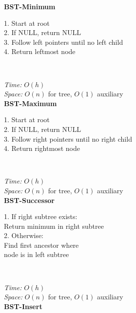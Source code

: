 \documentclass[a4paper]{extarticle}
\newcommand{\algofont}{\fontsize{4.3pt}{4.7pt}\selectfont}
\newcommand{\algocode}[1]{%
  \vspace{0pt}%
  \begin{algorithm}[H]
    \setlength{\abovecaptionskip}{0pt}%
    \setlength{\belowcaptionskip}{0pt}
    \setlength{\intextsep}{0pt}%
    \setlength{\textfloatsep}{0pt}
    \algofont  %
  \end{algorithm}%
  \vspace{0pt}%
}
\begin{document}
\begin{paracol}{3}
{\begin{minipage}[t]{1\linewidth}
\begin{minipage}[t]{0.49\linewidth}
       \textbf{BST-Minimum}\\
       \begin{minipage}[t]{\linewidth}
           1. Start at root\\
           2. If NULL, return NULL\\
           3. Follow left pointers until no left child\\
           4. Return leftmost node
       \end{minipage}\\[-10px]
       \algocode{bst-minimum}\vspace*{-25px}
       \textit{Time:} \(O(h)\)\\
       \textit{Space:} \(O(n)\) for tree, \(O(1)\) auxiliary\\
       \textbf{BST-Maximum}\\
       \begin{minipage}[t]{\linewidth}
           1. Start at root\\
           2. If NULL, return NULL\\
           3. Follow right pointers until no right child\\
           4. Return rightmost node
       \end{minipage}\\[-10px]
       \algocode{bst-maximum}\vspace*{-25px}
       \textit{Time:} \(O(h)\)\\
       \textit{Space:} \(O(n)\) for tree, \(O(1)\) auxiliary\\
       \textbf{BST-Successor}\\
       \begin{minipage}[t]{\linewidth}
           1. If right subtree exists:\\
           \quad Return minimum in right subtree\\
           2. Otherwise:\\
           \quad Find first ancestor where\\
           \quad node is in left subtree
       \end{minipage}\\[-10px]
       \algocode{bst-successor}\vspace*{-25px}
       \textit{Time:} \(O(h)\)\\
       \textit{Space:} \(O(n)\) for tree, \(O(1)\) auxiliary\\
       \textbf{BST-Insert}\\
       \begin{minipage}[t]{\linewidth}

\end{minipage}
\end{minipage}
\end{minipage}}
\end{paracol}
\end{document}
